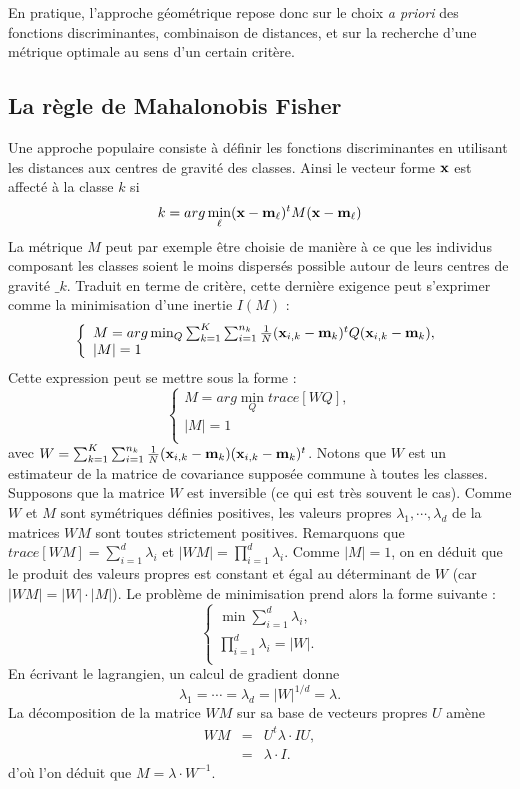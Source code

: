 En pratique, l'approche g\'eom\'etrique repose donc sur le choix {\em a priori}
des fonctions discriminantes, combinaison de distances, et sur la
recherche d'une m\'etrique optimale au sens d'un certain crit\`ere. 


%
%
\subsection{La r\`egle de Mahalonobis Fisher}

Une approche populaire consiste \`a d\'efinir les fonctions 
discriminantes en utilisant les distances aux centres de gravit\'e des classes.
Ainsi le vecteur forme $\mbox{\bf x}$ est affect\'e \`a la classe $k$ si
$$
k= arg \min_{\ell} (\mbox{\bf x}-\mbox{\bf m}_{\ell})^t M (\mbox{\bf x}-\mbox{\bf m}_{\ell})
$$
La m\'etrique $M$ peut par exemple \^etre choisie de mani\`ere
\`a ce que les individus composant les classes soient le 
moins dispers\'es possible autour de leurs centres de gravit\'e 
$\bm_k$. Traduit en terme de crit\`ere, cette derni\`ere
exigence peut s'exprimer comme la minimisation
d'une inertie $I(M)$ :
$$
\left \{ \begin{array}{l}
M= arg \min_Q   \sum_{k=1}^{K} \sum_{i=1}^{n_k} \frac{1}{N}(\mbox{\bf x}_{i,k}-\mbox{\bf m}_k)^t Q 
(\mbox{\bf x}_{i,k}-\mbox{\bf m}_k), \\
|M|=1\\
\end{array}
\right .
$$
Cette expression peut se mettre sous la forme :
$$
\left \{ \begin{array}{l}
M= arg \min_Q   trace[W Q], \\
|M|=1\\
\end{array}
\right.
$$
avec $W=\sum_{k=1}^{K} \sum_{i=1}^{n_k} \frac{1}{N}(\mbox{\bf x}_{i,k}-\mbox{\bf m}_k)(\mbox{\bf x}_{i,k}-
\mbox{\bf m}_k)^t$. Notons que $W$ est un estimateur de la matrice de covariance suppos\'ee
commune \`a toutes les classes.
Supposons que la matrice $W$ est inversible (ce qui est tr\`es souvent le cas).
Comme $W$ et $M$ sont sym\'etriques d\'efinies positives, les valeurs propres
$\lambda_1,\cdots,\lambda_d$ de la matrices $WM$ sont toutes strictement positives.
Remarquons que $trace[WM]=\sum_{i=1}^d \lambda_i$ et $|WM|=\prod_{i=1}^d 
\lambda_i$.
Comme $|M|=1$, on en d\'eduit que le produit des valeurs propres est constant et
\'egal au d\'eterminant de $W$ (car $|WM|=|W|\cdot|M|$). Le probl\`eme de minimisation
prend alors la forme suivante :
$$
\left \{ \begin{array}{l}
\min \sum_{i=1}^d \lambda_i, \\
\prod_{i=1}^d \lambda_i=|W|.\\
\end{array}
\right.
$$ 
En \'ecrivant le lagrangien, un calcul de gradient donne 
$$
\lambda_1=\cdots=\lambda_d=|W|^{1/d}=\lambda.
$$ 
La d\'ecomposition de la matrice $WM$ sur sa base de vecteurs propres $U$ am\`ene
\begin{eqnarray*}
WM & = & U^t \lambda \cdot I U,\\
   & = & \lambda \cdot I.
\end{eqnarray*}
d'o\`u l'on d\'eduit que $M=\lambda \cdot W^{-1}$. 

